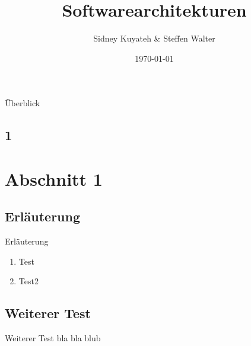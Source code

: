 \documentclass{beamer}
\title{Softwarearchitekturen}
\author{Sidney Kuyateh \& Steffen Walter}
\institute{Duale Hochschule Baden-Württemberg}
\date{\today}
\begin{document}
	\maketitle
	\begin{frame}{Überblick}
		\tableofcontents
	\end{frame}
	
		\subsection{1}	
	
	\section{Abschnitt 1}
		\subsection{Erläuterung}
			\begin{frame}{Erläuterung}
				\begin{enumerate}
					\item Test
					\item Test2
				\end{enumerate}
			\end{frame}
		\subsection{Weiterer Test}
			\begin{frame}{Weiterer Test}
				bla bla blub
			\end{frame}
\end{document}
